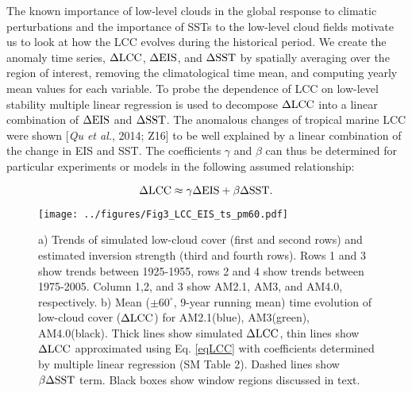 The known importance of low-level clouds in the global response to climatic perturbations and the importance of SSTs to the low-level cloud fields motivate us to look at how the LCC evolves during the historical period.  We create the anomaly time series, $\Delta \rm{LCC}$, $\Delta \rm{EIS}$, and $\Delta \rm{SST}$ by spatially averaging over the region of interest, removing the climatological time mean, and computing yearly mean values for each variable. 
To probe the dependence of LCC on low-level stability multiple linear regression is used to decompose $\Delta \rm{LCC}$ into a linear combination of $\Delta \rm{EIS}$ and $\Delta \rm{SST}$.  The anomalous changes of tropical marine LCC were shown [\textit{Qu et al.}, 2014; Z16] to be well explained by a linear combination of the change in EIS and SST.  
The coefficients $\gamma$ and $\beta$ can thus be determined for particular experiments or models in the following assumed relationship:

    \begin{equation} 
    \Delta \rm{LCC} \approx \gamma \Delta \rm{EIS} + \beta \Delta \rm{SST}.
    \label{eqLCC}
    \end{equation}  
    
\begin{figure}
    \texttt{[image: ../figures/Fig3\_LCC\_EIS\_ts\_pm60.pdf]}
    \caption{a) Trends of simulated low-cloud cover (first and second rows) and estimated inversion strength (third and fourth rows).  Rows 1 and 3 show trends between 1925-1955, rows 2 and 4 show trends between 1975-2005.  Column 1,2, and 3 show AM2.1, AM3, and AM4.0, respectively.   b) Mean ($\pm 60^{\circ}$, 9-year running mean) time evolution of low-cloud cover ($\Delta \rm{LCC}$) for AM2.1(blue), AM3(green), AM4.0(black).  Thick lines show simulated $\Delta \rm{LCC}$, thin lines show $\Delta \rm{LCC}$ approximated using Eq. \ref{eqLCC} with coefficients determined by multiple linear regression (SM Table 2).  Dashed lines show $\beta\Delta \rm{SST}$ term.  Black boxes show window regions discussed in text.}
  \label{fig:trends_lcceis_ts}
\end{figure}

